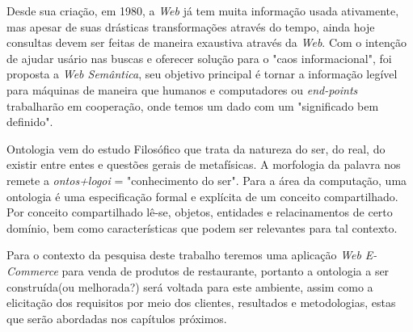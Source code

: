 Desde sua criação, em 1980, a \textit{Web} já tem muita informação usada ativamente, mas apesar de suas drásticas transformações através do tempo, ainda hoje consultas devem ser feitas de maneira exaustiva através da \textit{Web}. Com o intenção de ajudar usário nas buscas e oferecer solução para o "caos informacional", foi proposta a \textit{Web Semântica}, seu objetivo principal é tornar a informação legível para máquinas de maneira que humanos e computadores ou \textit{end-points} trabalharão em cooperação, onde temos um dado com um "significado bem definido"\cite{berners:2001}.

Ontologia vem do estudo Filosófico que trata da natureza do ser, do real, do existir entre entes e questões gerais de metafísicas. A morfologia da palavra nos remete a \textit{ontos+logoi} = "conhecimento do ser". Para a área da computação, uma ontologia é uma especificação formal e explícita de um conceito compartilhado. Por conceito compartilhado lê-se, objetos, entidades e relacinamentos de certo domínio, bem como características que podem ser relevantes para tal contexto\cite{gruber:1992}. 

Para o contexto da pesquisa deste trabalho teremos uma aplicação \textit{Web} \textit{E-Commerce} para venda de produtos de restaurante, portanto a ontologia a ser construída(ou melhorada?) será voltada para este ambiente, assim como a elicitação dos requisitos por meio dos clientes, resultados e metodologias, estas que serão abordadas nos capítulos próximos.
